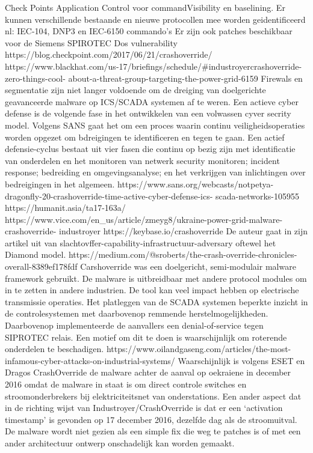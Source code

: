 {Check Points Application Control voor commandVisibility en baselining. Er kunnen
verschillende bestaande en nieuwe protocollen mee worden geidentificeerd nl: IEC-104,
DNP3 en IEC-6150 commando’s
Er zijn ook patches beschikbaar voor de Siemens SPIROTEC Dos vulnerability
https://blog.checkpoint.com/2017/06/21/crashoverride/
https://www.blackhat.com/us-17/briefings/schedule/#industroyercrashoverride-zero-things-cool-
about-a-threat-group-targeting-the-power-grid-6159
Firewals en segmentatie zijn niet langer voldoende om de dreiging van doelgerichte geavanceerde
malware op ICS/SCADA systemen af te weren.
Een actieve cyber defense is de volgende fase in het ontwikkelen van een volwassen cyver secrity
model. Volgens SANS gaat het om een proces waarin continu veiligheidsoperaties worden opgezet
om bdreigingen te identificeren en tegen te gaan. Een actief defensie-cyclus bestaat uit vier fasen die
continu op bezig zijn met identificatie van onderdelen en het monitoren van netwerk security
monitoren; incident response; bedreiding en omgevingsanalyse; en het verkrijgen van inlichtingen
over bedreigingen in het algemeen.
https://www.sans.org/webcasts/notpetya-dragonfly-20-crashoverride-time-active-cyber-defense-ics-
scada-networks-105955
https://humanit.asia/ta17-163a/
https://www.vice.com/en_us/article/zmeyg8/ukraine-power-grid-malware-crashoverride-
industroyer
https://keybase.io/crashoverride
De auteur gaat in zijn artikel uit van slachtovffer-capability-infrastructuur-adversary oftewel het
Diamond model.
https://medium.com/@sroberts/the-crash-override-chronicles-overall-8389ef178fdf
Carshoverride was een doelgericht, semi-modulair malware framework gebruikt.
De malware is uitbreidbaar met andere protocol modules om in te zetten in andere industrien. De
tool kan veel impact hebben op electrische transmissie operaties.
Het platleggen van de SCADA systemen beperkte inzicht in de controlesystemen met daarbovenop
remmende herstelmogelijkheden. Daarbovenop implementeerde de aanvallers een denial-of-service
tegen SIPROTEC relais. Een motief om dit te doen is waarschijnlijk om roterende onderdelen te
beschadigen.
https://www.oilandgaseng.com/articles/the-most-infamous-cyber-attacks-on-industrial-systems/
Waarschijnlijk is volgens ESET en Dragos CrashOverride de malware achter de aanval op oekraiene in
december 2016 omdat de malware in staat is om direct controle switches en stroomonderbrekers bij
elektriciteitsnet van onderstations. Een ander aspect dat in de richting wijst van
Industroyer/CrashOverride is dat er een ‘activation timestamp’ is gevonden op 17 december 2016,
dezelfde dag als de stroomuitval.
De malware wordt niet gezien als een simple fix die weg te patches is of met een ander architectuur
ontwerp onschadelijk kan worden gemaakt.

}
